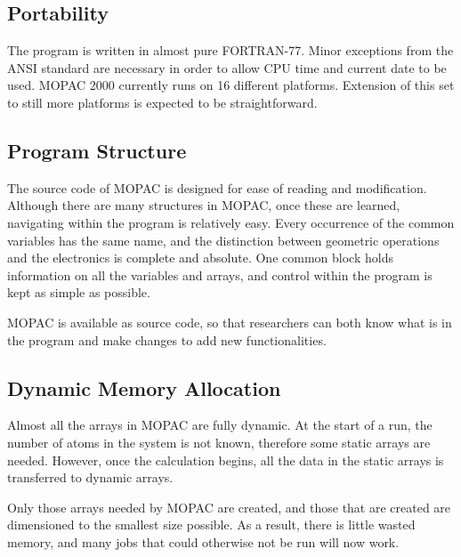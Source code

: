 \subsection{Portability}

The program is written in almost pure FORTRAN-77.  Minor exceptions from  the
ANSI standard are necessary in order to allow CPU time and current date to  be
used.  MOPAC 2000 currently runs on 16 different platforms.  Extension of  this
set to still more platforms is expected to be straightforward.

\subsection{Program Structure}

The source code of MOPAC is designed for ease of reading and modification.
Although there are many structures in MOPAC, once these are learned,
navigating within the program is relatively easy.  Every occurrence of the
common variables has the same name, and the distinction between geometric
operations and the electronics is complete and absolute.  One common block
holds information on all the variables and arrays, and control within the
program  is kept as simple as possible.

MOPAC is available as source code, so that researchers can both know what is
in the program and make changes to add new functionalities.

\subsection{Dynamic Memory Allocation}

Almost all the arrays in MOPAC are fully dynamic.  At the start of a run, the
number of atoms in the system is not known, therefore some static arrays are
needed.  However, once the calculation begins, all the data in the static
arrays is  transferred to dynamic arrays.

Only those arrays needed by MOPAC are created, and those that are created are
dimensioned to the smallest size possible.  As a result, there is little
wasted  memory, and many jobs that could otherwise not be run will now work.
